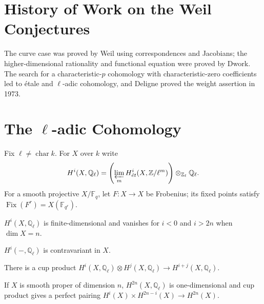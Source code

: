 \section{History of Work on the Weil Conjectures}
\label{ha-appC-sec2}

The curve case was proved by Weil using correspondences and Jacobians; the
higher-dimensional rationality and functional equation were proved by Dwork.
The search for a characteristic-$p$ cohomology with characteristic-zero
coefficients led to étale and $\ell$-adic cohomology, and Deligne proved the
weight assertion in 1973.

\section{The $\ell$-adic Cohomology}
\label{ha-appC-sec3}

\begin{definition}
Fix $\ell\ne\operatorname{char}k$.  For $X$ over $k$ write
\[
H^i(X,\mathbb Q_\ell)=
\left(\varprojlim_m H^i_{\acute et}(X,\mathbb Z/\ell^m)\right)\otimes_{\mathbb Z_\ell}\mathbb Q_\ell.
\]
For a smooth projective $X/\mathbb F_q$, let $F:X\to X$ be Frobenius; its
fixed points satisfy $\operatorname{Fix}(F^r)=X(\mathbb F_{q^r})$.
\end{definition}
\begin{convention}
\label{ha-appC-prop3-1}
$H^i(X,\mathbb Q_\ell)$ is finite-dimensional and vanishes for $i<0$ and
$i>2n$ when $\dim X=n$.
\end{convention}

\begin{convention}[Contravariance]
\label{ha-appC-prop3-2}
$H^i(-,\mathbb Q_\ell)$ is contravariant in $X$.
\end{convention}

\begin{convention}
\label{ha-appC-prop3-3}
There is a cup product
$H^i(X,\mathbb Q_\ell)\otimes H^j(X,\mathbb Q_\ell)\to H^{i+j}(X,\mathbb Q_\ell)$.
\end{convention}

\begin{convention}
\label{ha-appC-prop3-4}
If $X$ is smooth proper of dimension $n$, $H^{2n}(X,\mathbb Q_\ell)$ is
one-dimensional and cup product gives a perfect pairing
$H^i(X)\times H^{2n-i}(X)\to H^{2n}(X)$.
\end{convention}

